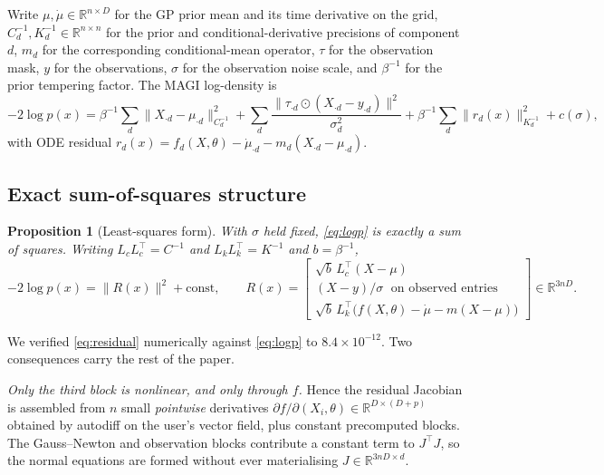 \documentclass[11pt]{article}
\newcommand{\R}{\mathbb{R}}
\theoremstyle{plain}
\newtheorem{proposition}{Proposition}
\theoremstyle{definition}
\theoremstyle{remark}
\begin{document}
Write $\mu, \dot\mu \in \R^{n \times D}$ for the GP prior mean and its time derivative on the grid,
$C_d^{-1}, K_d^{-1} \in \R^{n\times n}$ for the prior and conditional-derivative precisions of
component $d$, $m_d$ for the corresponding conditional-mean operator, $\tau$ for the observation
mask, $y$ for the observations, $\sigma$ for the observation noise scale, and $\beta^{-1}$ for the
prior tempering factor. The MAGI log-density is
\begin{equation}
\label{eq:logp}
-2\log p(x) = \beta^{-1}\!\!\sum_d \|X_{\cdot d}-\mu_{\cdot d}\|^2_{C_d^{-1}}
  + \sum_{d}\frac{\|\tau_{\cdot d}\odot (X_{\cdot d}-y_{\cdot d})\|^2}{\sigma_d^2}
  + \beta^{-1}\!\!\sum_d \|r_d(x)\|^2_{K_d^{-1}} + c(\sigma),
\end{equation}
with ODE residual $r_d(x) = f_d(X,\theta) - \dot\mu_{\cdot d} - m_d (X_{\cdot d}-\mu_{\cdot d})$.

\subsection{Exact sum-of-squares structure}

\begin{proposition}[Least-squares form]
\label{prop:lsq}
With $\sigma$ held fixed, \eqref{eq:logp} is exactly a sum of squares. Writing $L_cL_c^\top =
C^{-1}$ and $L_kL_k^\top = K^{-1}$ and $b = \beta^{-1}$,
\begin{equation}
\label{eq:residual}
  -2\log p(x) = \|R(x)\|^2 + \text{const},\qquad
  R(x) = \begin{bmatrix}
    \sqrt{b}\, L_c^\top (X-\mu)\\[2pt]
    (X-y)/\sigma \;\text{ on observed entries}\\[2pt]
    \sqrt{b}\, L_k^\top\big(f(X,\theta)-\dot\mu-m(X-\mu)\big)
  \end{bmatrix} \in \R^{3nD}.
\end{equation}
\end{proposition}

\noindent
We verified \eqref{eq:residual} numerically against \eqref{eq:logp} to $8.4\times10^{-12}$. Two
consequences carry the rest of the paper.

\emph{Only the third block is nonlinear, and only through $f$.} Hence the residual Jacobian is
assembled from $n$ small \emph{pointwise} derivatives $\partial f/\partial(X_i,\theta) \in
\R^{D\times(D+p)}$ obtained by autodiff on the user's vector field, plus constant precomputed
blocks. The Gauss--Newton and observation blocks contribute a constant term to $J^\top J$, so the
normal equations are formed without ever materialising $J \in \R^{3nD \times d}$.
\end{document}
